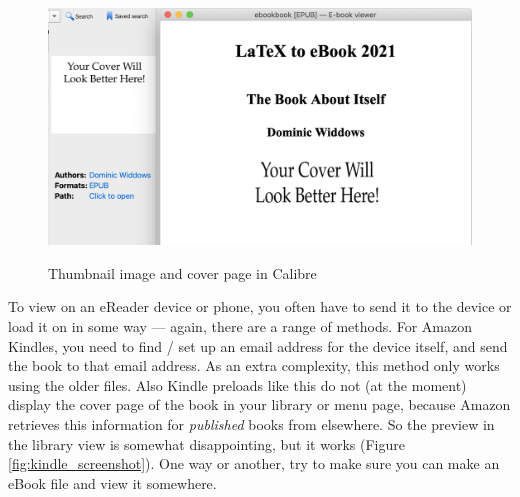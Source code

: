 \begin{figure}
  \begin{center}
  \vspace{0.2cm}
  \includegraphics[width=\linewidth]{images/calibre_screenshot.png}
  \vspace{0.4cm}
\caption{Thumbnail image and cover page in Calibre}
\vspace{0.4cm}
\label{fig:calibre_screenshot}
\end{center}
\end{figure}

To view on an eReader device or phone, you often have to send it to
the device or load it on in some way --- again, there are a range of
methods. For Amazon Kindles, you need to find / set up an email address for the
device itself, and send the book to that email address. As an extra
complexity, this method only works using the older 
files.  Also Kindle preloads like this do not (at the moment)
display the cover page of the book in your library or menu page,
because Amazon retrieves this information for {\em published} books
from elsewhere. So the preview in the library view is somewhat
disappointing, but it works (Figure \ref{fig:kindle_screenshot}).
One way or another, try to make sure you can make an eBook file and view it somewhere.

